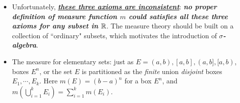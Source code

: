 \documentclass[11pt]{article}
\begin{document}
\begin{itemize}
\item \begin{remark}
Unfortunately, \underline{\emph{\textbf{these three axioms are inconsistent}}}: \emph{\textbf{no proper definition of measure function $m$ could satisfies all these three axioms for any subset in ${\mathbb R}$}}. The measure theory should be built on a collection of ``ordinary" subsets, which motivates the introduction of \emph{\textbf{$\sigma$-algebra}}. 
\end{remark}


\item The measure for elementary sets: just as $E= (a,b), [a,b], (a,b], [a,b)$, boxes $E^{n}$, or the set $E$ is partitioned as the \emph{finite} union \emph{disjoint} boxes $E_{1},\cdots, E_{k}$. Here $m(E) = (b-a)^{n}$ for a box $E^{n}$, and $m(\bigcup_{i=1}^{k}E_{i})= \sum_{i=1}^{k}m(E_{i})$.
\end{itemize}
\end{document}

